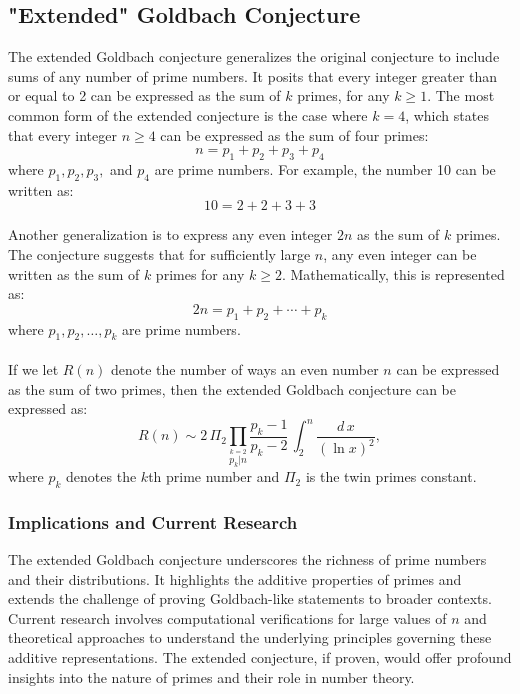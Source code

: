 \documentclass[a4paper, 12pt]{article}
\begin{document}
\subsection{"Extended" Goldbach Conjecture}
The extended Goldbach conjecture generalizes the original conjecture to include sums of any number of prime numbers. It posits that every integer greater than or equal to 2 can be expressed as the sum of \( k \) primes, for any \( k \geq 1 \). The most common form of the extended conjecture is the case where \( k = 4 \), which states that every integer \( n \geq 4 \) can be expressed as the sum of four primes:
\begin{equation}
n = p_1 + p_2 + p_3 + p_4
\end{equation}
where \( p_1, p_2, p_3, \) and \( p_4 \) are prime numbers. For example, the number 10 can be written as:
\begin{equation}
10 = 2 + 2 + 3 + 3
\end{equation}

Another generalization is to express any even integer \( 2n \) as the sum of \( k \) primes. The conjecture suggests that for sufficiently large \( n \), any even integer can be written as the sum of \( k \) primes for any \( k \geq 2 \). Mathematically, this is represented as:
\begin{equation}
2n = p_1 + p_2 + \cdots + p_k
\end{equation}
where \( p_1, p_2, \ldots, p_k \) are prime numbers.
\\\\
If we let \( R(n) \) denote the number of ways an even number \( n \) can be expressed as the sum of two primes, then the extended Goldbach conjecture can be expressed as:
\begin{equation}
R\left(n\right)\sim2\,\Pi_{2}\prod_{\stackrel{k=2}{p_{k}|n}}\frac{p_{k}-1}{p_{k}-2}\,\int_{2}^{n}\frac{d\,x}{\left(\ln x\right)^{2}},
\end{equation}
where \( p_k \) denotes the \( k \)th prime number and \( \Pi_2 \) is the twin primes constant.

\subsubsection{Implications and Current Research}
The extended Goldbach conjecture underscores the richness of prime numbers and their distributions. It highlights the additive properties of primes and extends the challenge of proving Goldbach-like statements to broader contexts. Current research involves computational verifications for large values of \( n \) and theoretical approaches to understand the underlying principles governing these additive representations. The extended conjecture, if proven, would offer profound insights into the nature of primes and their role in number theory.
\end{document}

